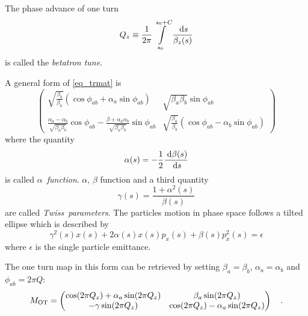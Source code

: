 The phase advance of one turn
%
\begin{equation}
    Q_z \equiv \frac{1}{2\pi}\int\limits_{s_0}^{s_0+C} \frac{\;\text{d} s}{\beta_z(s)}
\end{equation}
%
is called the \emph{betatron tune}.

A general form of \eqref{eq_trmat} is 
%
\begin{equation}
    \begin{pmatrix}
        \sqrt{\frac{\beta_b}{\beta_a}}(\cos\phi_{ab} + \alpha_a \sin\phi_{ab}) &
        \sqrt{\beta_a\beta_b} \sin\phi_{ab} \\
        \frac{\alpha_a - \alpha_b}{\sqrt{\beta_a\beta_b}}\cos\phi_{ab} - \frac{\beta+\alpha_a\alpha_b}{\sqrt{\beta_a\beta_b}}\sin\phi_{ab} &
        \sqrt{\frac{\beta_a}{\beta_b}}(\cos\phi_{ab} - \alpha_b\sin\phi_{ab})
    \end{pmatrix}
    \label{eq_trmat_01}
\end{equation}
%
where the quantity
%
\begin{equation}
    \alpha(s) = -\frac{1}{2}\frac{\;\text{d} \beta(s)}{ \;\text{d} s}
    \label{eq_alpha}
\end{equation}
%
is called $\alpha$~\emph{function}.
%
$\alpha$, $\beta$ function and a third quantity
%
\begin{equation}
    \gamma(s) = \frac{1+\alpha^2(s)}{\beta(s)}
\end{equation}
%
are called \emph{Twiss~parameters}. The particles motion in phase space follows a tilted ellipse which is described by
%
\begin{equation}
    \gamma^2(s)x(s) + 2\alpha(s)x(s)p_x(s) + \beta(s)p_x^2(s) = \epsilon
\end{equation}
%
where $\epsilon$ is the single particle emittance.

The one turn map in this form can be retrieved by setting $\beta_a = \beta_b $, ${\alpha_a = \alpha_b}$
and ${\phi_{ab} = 2\pi Q}$:
%
\begin{equation}
    M_\text{OT} = \begin{pmatrix}
        \cos(2\pi Q_z) + \alpha_a \sin(2\pi Q_z) & \beta_a\sin(2\pi Q_z) \\
        -\gamma\sin(2\pi Q_z) & \cos(2\pi Q_z) - \alpha_a\sin(2\pi Q_z)
    \end{pmatrix}
    \quad .
\end{equation}
%
